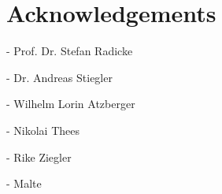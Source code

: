\chapter{Acknowledgements}

- Prof. Dr. Stefan Radicke

- Dr. Andreas Stiegler

- Wilhelm Lorin Atzberger

- Nikolai Thees

- Rike Ziegler

- Malte